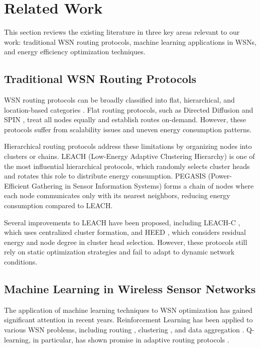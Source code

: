 \documentclass[conference]{IEEEtran}
\begin{document}
\section{Related Work}

This section reviews the existing literature in three key areas relevant to our work: traditional WSN routing protocols, machine learning applications in WSNs, and energy efficiency optimization techniques.

\subsection{Traditional WSN Routing Protocols}

WSN routing protocols can be broadly classified into flat, hierarchical, and location-based categories \cite{al2005survey}. Flat routing protocols, such as Directed Diffusion \cite{intanagonwiwat2000directed} and SPIN \cite{kulik2002negotiation}, treat all nodes equally and establish routes on-demand. However, these protocols suffer from scalability issues and uneven energy consumption patterns.

Hierarchical routing protocols address these limitations by organizing nodes into clusters or chains. LEACH (Low-Energy Adaptive Clustering Hierarchy) \cite{heinzelman2000energy} is one of the most influential hierarchical protocols, which randomly selects cluster heads and rotates this role to distribute energy consumption. PEGASIS (Power-Efficient Gathering in Sensor Information Systems) \cite{lindsey2002pegasis} forms a chain of nodes where each node communicates only with its nearest neighbors, reducing energy consumption compared to LEACH.

Several improvements to LEACH have been proposed, including LEACH-C \cite{heinzelman2002application}, which uses centralized cluster formation, and HEED \cite{younis2004heed}, which considers residual energy and node degree in cluster head selection. However, these protocols still rely on static optimization strategies and fail to adapt to dynamic network conditions.

\subsection{Machine Learning in Wireless Sensor Networks}

The application of machine learning techniques to WSN optimization has gained significant attention in recent years. Reinforcement Learning has been applied to various WSN problems, including routing \cite{forster2007machine}, clustering \cite{kuila2014energy}, and data aggregation \cite{wang2019reinforcement}. Q-learning, in particular, has shown promise in adaptive routing protocols \cite{liu2019q}.
\end{document}
